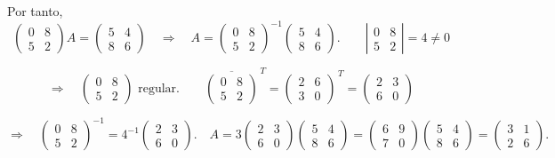 \documentclass[a4paper,12pt]{article}
\begin{document}
\begin{ejercicio}[title=Ejercicio 22]
Por tanto,
\[
\begin{pmatrix}0 & 8\\ 5 & 2\end{pmatrix} A = \begin{pmatrix}5 & 4\\ 8 & 6\end{pmatrix}
\quad \Rightarrow \quad 
A = \begin{pmatrix}0 & 8\\ 5 & 2\end{pmatrix}^{-1} \begin{pmatrix}5 & 4\\ 8 & 6\end{pmatrix}. \qquad
\left|\begin{matrix}0 & 8\\ 5 & 2\end{matrix}\right| = 4 \ne 0
\]

\[
\Rightarrow \quad
\begin{pmatrix}
    0 & 8\\ 5 & 2
\end{pmatrix}
\text{ regular.} \qquad
\overline{\begin{pmatrix}0 & 8\\ 5 & 2\end{pmatrix}}^{\,T} = 
\begin{pmatrix}2 & 6\\ 3 & 0\end{pmatrix}^{\,T} = 
\begin{pmatrix}2 & 3\\ 6 & 0\end{pmatrix}
\]

\[
\Rightarrow \quad 
\begin{pmatrix}0 & 8\\ 5 & 2\end{pmatrix}^{-1} = 4^{-1} 
\begin{pmatrix}2 & 3\\ 6 & 0\end{pmatrix}.
\quad
A = 3 
\begin{pmatrix}2 & 3\\ 6 & 0\end{pmatrix} 
\begin{pmatrix}5 & 4\\ 8 & 6\end{pmatrix} =
\begin{pmatrix}6 & 9\\ 7 & 0\end{pmatrix} 
\begin{pmatrix}5 & 4\\ 8 & 6\end{pmatrix} =
\boxed{
\begin{pmatrix}3 & 1\\ 2 & 6\end{pmatrix}}.
\]

\end{ejercicio}
\end{document}
